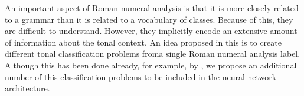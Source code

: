 

An important aspect of Roman numeral analysis is that it is
more closely related to a grammar than it is related to a
vocabulary of classes. Because of this, they are difficult
to understand. However, they implicitly encode an extensive
amount of information about the tonal context. An idea
proposed in this \thesisdiss{} is to create different tonal
classification problems froma single Roman numeral analysis
label. Although this has been done already, for example, by
\textcite{chen2018functional}, we propose an additional
number of this classification problems to be included in the
neural network architecture.
